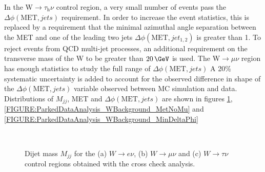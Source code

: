 In the W$\rightarrow\tau_{\mathrm{h}}\nu$ control region, a very small number of events pass the $\Delta\phi(\text{MET},jets)$ requirement. In order to increase the event statistics, this is replaced by a requirement that the minimal azimuthal angle separation between the \gls{MET} and one of the leading two jets $\Delta\phi(\text{MET},jet_{1,2})$ is greater than 1. To reject events from \gls{QCD} multi-jet processes, an additional requirement on the transverse mass of the W to be greater than $20\,\GeV$ is used. The W$\rightarrow\mu\nu$ region has enough statistics to study the full range of $\Delta\phi(\text{MET},jets)$ A 20\% systematic uncertainty is added to account for the observed difference in shape of the $\Delta\phi(\text{MET},jets)$ variable observed between \gls{MC} simulation and data. Distributions of $M_{jj}$, \gls{MET} and $\Delta\phi(\text{MET},jets)$ are shown in figures \ref{FIGURE:ParkedDataAnalysis_WBackground_Mjj}, \ref{FIGURE:ParkedDataAnalysis_WBackground_MetNoMu} and \ref{FIGURE:ParkedDataAnalysis_WBackground_MinDeltaPhi}

\begin{figure}[!htb]
\centering
{}
 \\
\caption[Dijet mass $M_{jj}$ for the $W\rightarrow e\nu$, $W\rightarrow\mu\nu$ and $W\rightarrow\tau\nu$ control regions obtained with the cross check analysis.]
{Dijet mass $M_{jj}$ for the (a) $W\rightarrow e\nu$, (b) $W\rightarrow\mu\nu$ and (c) $W\rightarrow\tau\nu$ control regions obtained with the cross check analysis.}
\label{FIGURE:ParkedDataAnalysis_WBackground_Mjj}
\end{figure}

